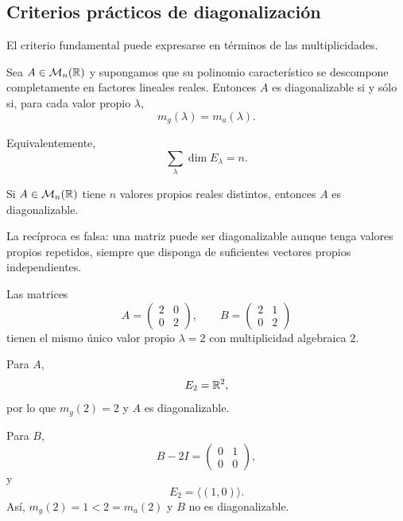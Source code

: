\subsection{Criterios prácticos de diagonalización}

El criterio fundamental puede expresarse en términos de las multiplicidades.

\begin{theorem}
Sea $A\in\mathcal M_n(\mathbb{R})$ y supongamos que su polinomio característico se descompone completamente en factores lineales reales. Entonces $A$ es diagonalizable si y sólo si, para cada valor propio $\lambda$,
\[
m_g(\lambda)=m_a(\lambda).
\]
\end{theorem}

Equivalentemente,
\[
\sum_{\lambda}\dim E_\lambda=n.
\]

\begin{corollary}
Si $A\in\mathcal M_n(\mathbb{R})$ tiene $n$ valores propios reales distintos, entonces $A$ es diagonalizable.
\end{corollary}

La recíproca es falsa: una matriz puede ser diagonalizable aunque tenga valores propios repetidos, siempre que disponga de suficientes vectores propios independientes.

\begin{example}
Las matrices
\[
A=\begin{pmatrix}
2&0\\
0&2
\end{pmatrix},
\qquad
B=\begin{pmatrix}
2&1\\
0&2
\end{pmatrix}
\]
tienen el mismo único valor propio $\lambda=2$ con multiplicidad algebraica $2$.

Para $A$,
\[
E_2=\mathbb{R}^2,
\]
por lo que $m_g(2)=2$ y $A$ es diagonalizable.

Para $B$,
\[
B-2I=\begin{pmatrix}0&1\\0&0\end{pmatrix},
\]
y
\[
E_2=\langle(1,0)\rangle.
\]
Así, $m_g(2)=1<2=m_a(2)$ y $B$ no es diagonalizable.
\end{example}

